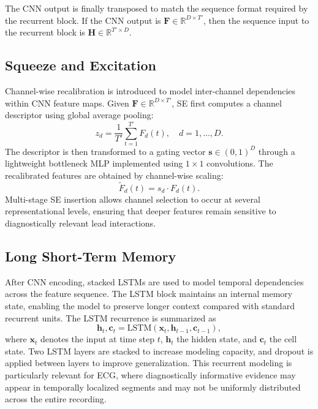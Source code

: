 \documentclass[preprint,12pt]{elsarticle}
\begin{document}
The CNN output is finally transposed to match the sequence format required by the recurrent block. If the CNN output is $\mathbf{F}\in\mathbb{R}^{D\times T'}$, then the sequence input to the recurrent block is $\mathbf{H}\in\mathbb{R}^{T'\times D}$.

\subsection{Squeeze and Excitation}
Channel-wise recalibration is introduced to model inter-channel dependencies within CNN feature maps. Given $\mathbf{F}\in\mathbb{R}^{D\times T'}$, SE first computes a channel descriptor using global average pooling:
\begin{equation}
z_d=\frac{1}{T'}\sum_{t=1}^{T'}F_d(t), \quad d=1,\dots,D.
\label{eq:se_squeeze}
\end{equation}
The descriptor is then transformed to a gating vector $\mathbf{s}\in(0,1)^D$ through a lightweight bottleneck MLP implemented using $1\times1$ convolutions. The recalibrated features are obtained by channel-wise scaling:
\begin{equation}
\tilde{F}_d(t)=s_d\cdot F_d(t).
\label{eq:se_scale}
\end{equation}
Multi-stage SE insertion allows channel selection to occur at several representational levels, ensuring that deeper features remain sensitive to diagnostically relevant lead interactions.

\subsection{Long Short-Term Memory}
After CNN encoding, stacked LSTMs are used to model temporal dependencies across the feature sequence. The LSTM block maintains an internal memory state, enabling the model to preserve longer context compared with standard recurrent units. The LSTM recurrence is summarized as
\begin{equation}
\mathbf{h}_t, \mathbf{c}_t = \mathrm{LSTM}(\mathbf{x}_t, \mathbf{h}_{t-1}, \mathbf{c}_{t-1}),
\label{eq:lstm_core}
\end{equation}
where $\mathbf{x}_t$ denotes the input at time step $t$, $\mathbf{h}_t$ the hidden state, and $\mathbf{c}_t$ the cell state. Two LSTM layers are stacked to increase modeling capacity, and dropout is applied between layers to improve generalization. This recurrent modeling is particularly relevant for ECG, where diagnostically informative evidence may appear in temporally localized segments and may not be uniformly distributed across the entire recording.
\end{document}
